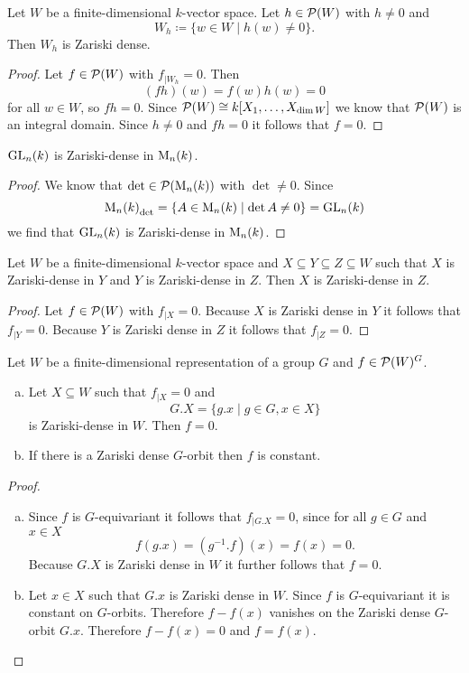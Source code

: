 \begin{lem}
 Let $W$ be a finite-dimensional $k$-vector space. Let $h \in \mathcal{P}(W)$ with $h \neq 0$ and
 \[
  W_h \coloneqq \{w \in W \mid h(w) \neq 0\}.
 \]
 Then $W_h$ is Zariski dense.
\end{lem}
\begin{proof}
 Let $f \in \mathcal{P}(W)$ with $f_{|W_h} = 0$. Then
 \[
  (fh)(w) = f(w)h(w) = 0
 \]
 for all $w \in W$, so $fh = 0$. Since $\mathcal{P}(W) \cong k[X_1, \dotsc, X_{\dim W}]$ we know that $\mathcal{P}(W)$ is an integral domain. Since $h \neq 0$ and $fh = 0$ it follows that $f = 0$.
\end{proof}


\begin{cor}
 $\operatorname{GL}_n(k)$ is Zariski-dense in $\operatorname{M}_n(k)$.
\end{cor}
\begin{proof}
 We know that $\det \in \mathcal{P}(\operatorname{M}_n(k))$ with $\det \neq 0$. Since
 \[
  {\operatorname{M}_n(k)}_{\det} = \{A \in \operatorname{M}_n(k) \mid \det A \neq 0\} = \operatorname{GL}_n(k)
 \]
 we find that $\operatorname{GL}_n(k)$ is Zariski-dense in $\operatorname{M}_n(k)$.
\end{proof}


\begin{prop}
 Let $W$ be a finite-dimensional $k$-vector space and $X \subseteq Y \subseteq Z \subseteq W$ such that $X$ is Zariski-dense in $Y$ and $Y$ is Zariski-dense in $Z$. Then $X$ is Zariski-dense in $Z$.
\end{prop}
\begin{proof}
 Let $f \in \mathcal{P}(W)$ with $f_{|X} = 0$. Because $X$ is Zariski dense in $Y$ it follows that $f_{|Y} = 0$. Because $Y$ is Zariski dense in $Z$ it follows that $f_{|Z} = 0$.
\end{proof}


\begin{lem}\label{lem: zariski density orbits}
 Let $W$ be a finite-dimensional representation of a group $G$ and $f \in \mathcal{P}(W)^G$.
 \begin{enumerate}[a)]
  \item
  Let $X \subseteq W$ such that $f_{|X} = 0$ and
  \[
   G.X = \{g.x \mid g \in G, x \in X\}
  \]
  is Zariski-dense in $W$. Then $f = 0$.
  \item
  If there is a Zariski dense $G$-orbit then $f$ is constant.
 \end{enumerate}
\end{lem}
\begin{proof}\leavevmode
 \begin{enumerate}[a)]
  \item
  Since $f$ is $G$-equivariant it follows that $f_{|G.X} = 0$, since for all $g \in G$ and $x \in X$
  \[
   f(g.x) = \left(g^{-1}.f\right)(x) = f(x) = 0.
  \]
  Because $G.X$ is Zariski dense in $W$ it further follows that $f = 0$.
  \item
  Let $x \in X$ such that $G.x$ is Zariski dense in $W$. Since $f$ is $G$-equivariant it is constant on $G$-orbits. Therefore $f-f(x)$ vanishes on the Zariski dense $G$-orbit $G.x$. Therefore $f-f(x) = 0$ and $f = f(x)$.
 \end{enumerate}
\end{proof}


